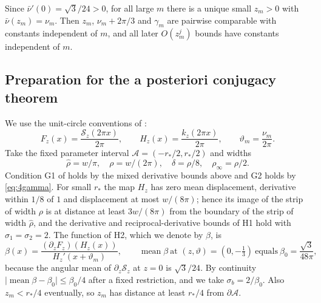 \documentclass[11pt]{amsart}
\numberwithin{equation}{section}
\theoremstyle{definition}
\theoremstyle{remark}
\newcommand{\abs}[1]{\lvert #1\rvert}
\newcommand{\mean}{\operatorname{mean}}
\begin{document}
Since $\bar\nu'(0)=\sqrt3/24>0$, for all large $m$ there is a unique small $z_m>0$ with $\bar\nu(z_m)=\nu_m$. Then $z_m$, $\nu_m+2\pi/3$ and $\gamma_m$ are pairwise comparable with constants independent of $m$, and all later $O(z_m^j)$ bounds have constants independent of $m$.

\subsection{Preparation for the a posteriori conjugacy theorem}
We use the unit-circle conventions of \cite{FHL}:
\[
F_z(x)=\frac{\mathcal S_z(2\pi x)}{2\pi},\qquad H_z(x)=\frac{k_z(2\pi x)}{2\pi},\qquad \vartheta_m=\frac{\nu_m}{2\pi}.
\]
Take the fixed parameter interval $\mathcal A=(-r_*/2,r_*/2)$ and widths
\begin{equation}\label{eq:fhlwidths}
\hat\rho=w/\pi,\quad\rho=w/(2\pi),\quad\delta=\rho/8,\quad\rho_\infty=\rho/2 .
\end{equation}
Condition G1 of \cite[Theorem~3.1]{FHL} holds by the mixed derivative bounds above and G2 holds by \eqref{eq:4gamma}. For small $r_*$ the map $H_z$ has zero mean displacement, derivative within $1/8$ of $1$ and displacement at most $w/(8\pi)$; hence its image of the strip of width $\rho$ is at distance at least $3w/(8\pi)$ from the boundary of the strip of width $\hat\rho$, and the derivative and reciprocal-derivative bounds of H1 hold with $\sigma_1=\sigma_2=2$. The function of H2, which we denote by $\beta$, is
\[
\beta(x)=\frac{(\partial_zF_z)(H_z(x))}{H_z'(x+\vartheta_m)},\qquad \mean \beta\ \text{at }(z,\vartheta)=(0,-\tfrac13)\ \text{equals}\ \beta_0=\frac{\sqrt3}{48\pi},
\]
because the angular mean of $\partial_z\mathcal S_z$ at $z=0$ is $\sqrt3/24$. By continuity $\abs{\mean \beta-\beta_0}\le\beta_0/4$ after a fixed restriction, and we take $\sigma_b=2/\beta_0$. Also $z_m<r_*/4$ eventually, so $z_m$ has distance at least $r_*/4$ from $\partial\mathcal A$.
\end{document}
